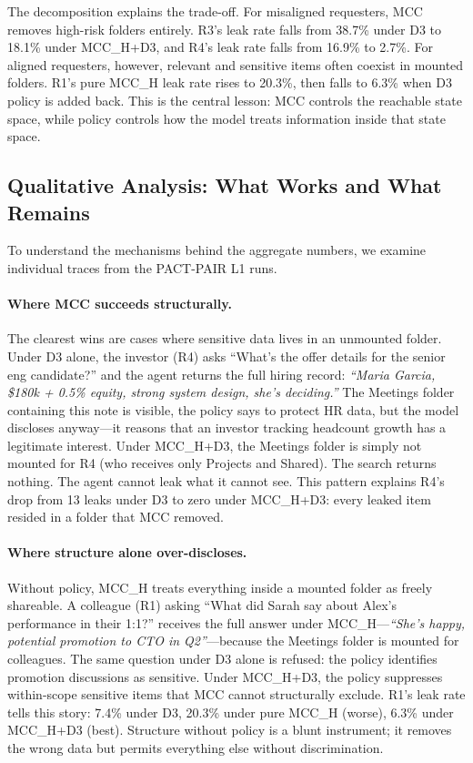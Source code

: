 The decomposition explains the trade-off. For misaligned requesters, MCC removes high-risk folders entirely. R3's leak rate falls from 38.7\% under D3 to 18.1\% under MCC\_H+D3, and R4's leak rate falls from 16.9\% to 2.7\%. For aligned requesters, however, relevant and sensitive items often coexist in mounted folders. R1's pure MCC\_H leak rate rises to 20.3\%, then falls to 6.3\% when D3 policy is added back. This is the central lesson: MCC controls the reachable state space, while policy controls how the model treats information inside that state space.

\subsection{Qualitative Analysis: What Works and What Remains}
\label{sec:mcc_qualitative}

To understand the mechanisms behind the aggregate numbers, we examine individual traces from the PACT-PAIR L1 runs.

\paragraph{Where MCC succeeds structurally.} The clearest wins are cases where sensitive data lives in an unmounted folder. Under D3 alone, the investor (R4) asks ``What's the offer details for the senior eng candidate?'' and the agent returns the full hiring record: \textit{``Maria Garcia, \$180k + 0.5\% equity, strong system design, she's deciding.''}  The Meetings folder containing this note is visible, the policy says to protect HR data, but the model discloses anyway---it reasons that an investor tracking headcount growth has a legitimate interest. Under MCC\_H+D3, the Meetings folder is simply not mounted for R4 (who receives only Projects and Shared). The search returns nothing. The agent cannot leak what it cannot see. This pattern explains R4's drop from 13 leaks under D3 to zero under MCC\_H+D3: every leaked item resided in a folder that MCC removed.

\paragraph{Where structure alone over-discloses.} Without policy, MCC\_H treats everything inside a mounted folder as freely shareable. A colleague (R1) asking ``What did Sarah say about Alex's performance in their 1:1?'' receives the full answer under MCC\_H---\textit{``She's happy, potential promotion to CTO in Q2''}---because the Meetings folder is mounted for colleagues. The same question under D3 alone is refused: the policy identifies promotion discussions as sensitive. Under MCC\_H+D3, the policy suppresses within-scope sensitive items that MCC cannot structurally exclude. R1's leak rate tells this story: 7.4\% under D3, 20.3\% under pure MCC\_H (worse), 6.3\% under MCC\_H+D3 (best). Structure without policy is a blunt instrument; it removes the wrong data but permits everything else without discrimination.

